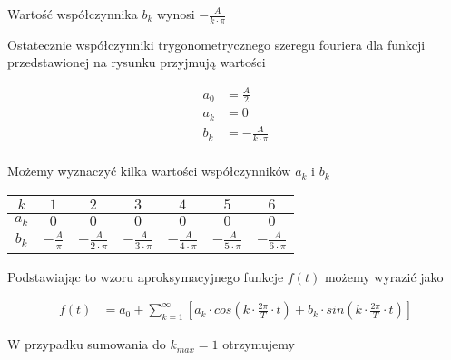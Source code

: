 \begin{task}
Wartość współczynnika $b_k$ wynosi $-\frac{A}{k\cdot \pi}$

Ostatecznie współczynniki trygonometrycznego szeregu fouriera dla funkcji przedstawionej na rysunku przyjmują wartości

\begin{equation}
\begin{aligned}
a_0&=\frac{A}{2}\\
a_k&=0\\
b_k&=-\frac{A}{k\cdot \pi}\\
\end{aligned}
\end{equation}

Możemy wyznaczyć kilka wartości współczynników $a_k$ i $b_k$

\begin{table}[H]
  \centering  
  \begin{tabular}{|c|c|c|c|c|c|c|}
    \hline 
    $k$ & $1$ & $2$ & $3$ & $4$ & $5$ & $6$\\ 
    \hline 
    $a_k$ & $0$ & $0$ & $0$ & $0$ & $0$ & $0$\\ 
    \hline 
    $b_k$ & $-\frac{A}{\pi}$ & $-\frac{A}{2\cdot \pi}$ & $-\frac{A}{3\cdot \pi}$ & $-\frac{A}{4\cdot \pi}$ & $-\frac{A}{5\cdot \pi}$ & $-\frac{A}{6\cdot \pi}$\\ 
    \hline 
  \end{tabular} 
\end{table}

Podstawiając to wzoru aproksymacyjnego funkcje $f(t)$ możemy wyrazić jako

\begin{equation}
\begin{aligned}
f(t) &= a_0 + \sum_{k=1}^{\infty} \left[ a_k \cdot cos\left( k \cdot \frac{2\pi}{T} \cdot t\right) + b_k \cdot sin\left(k \cdot \frac{2\pi}{T} \cdot t\right)\right]
\end{aligned}
\end{equation}

W przypadku sumowania do $k_{max}=1$ otrzymujemy 

\begin{figure}[H]
  \centering
\end{figure}
\end{task}
